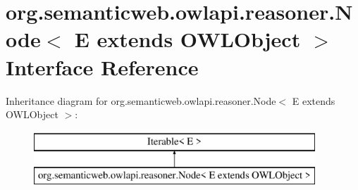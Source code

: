 \hypertarget{interfaceorg_1_1semanticweb_1_1owlapi_1_1reasoner_1_1_node_3_01_e_01extends_01_o_w_l_object_01_4}{\section{org.\-semanticweb.\-owlapi.\-reasoner.\-Node$<$ E extends O\-W\-L\-Object $>$ Interface Reference}
\label{interfaceorg_1_1semanticweb_1_1owlapi_1_1reasoner_1_1_node_3_01_e_01extends_01_o_w_l_object_01_4}
}
Inheritance diagram for org.\-semanticweb.\-owlapi.\-reasoner.\-Node$<$ E extends O\-W\-L\-Object $>$\-:\begin{figure}[H]
\begin{center}
\leavevmode
\includegraphics[height=2.000000cm]{interfaceorg_1_1semanticweb_1_1owlapi_1_1reasoner_1_1_node_3_01_e_01extends_01_o_w_l_object_01_4}
\end{center}
\end{figure}
